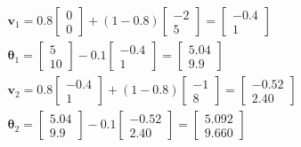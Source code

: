 \documentclass{dlproblemset}
\begin{document}
\begin{enumerate}[1)]
\begin{enumerate}
\begin{align*}
            \mathbf{v}_1=0.8\begin{bmatrix}
        0 \\
        0
      \end{bmatrix} + (1-0.8)\begin{bmatrix}
        -2 \\
        5
      \end{bmatrix}=\begin{bmatrix}
        -0.4 \\
        1
      \end{bmatrix}\\
      \boldsymbol{\theta}_{1} =
      \begin{bmatrix}
        5 \\
        10
      \end{bmatrix} -0.1\begin{bmatrix}
        -0.4 \\
        1
      \end{bmatrix} = \begin{bmatrix}
        5.04 \\
        9.9
      \end{bmatrix}\\
      \mathbf{v}_2=0.8\begin{bmatrix}
        -0.4 \\
        1
      \end{bmatrix} + (1-0.8)\begin{bmatrix}
        -1 \\
        8
      \end{bmatrix}=\begin{bmatrix}
        -0.52 \\
        2.40
      \end{bmatrix}\\
      \boldsymbol{\theta}_{2} =
      \begin{bmatrix}
        5.04 \\
        9.9
      \end{bmatrix} -0.1\begin{bmatrix}
        -0.52 \\
        2.40
      \end{bmatrix} = \begin{bmatrix}
        5.092 \\
        9.660
      \end{bmatrix}
        \end{align*}


\end{enumerate}
\end{enumerate}
\end{document}
